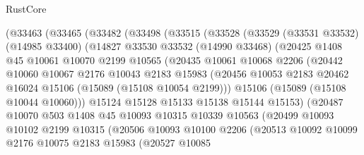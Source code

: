 \begin{lexlean}{RustCore}
\begin{coremodule}
        (@33463
          (@33465
            (@33482
              (@33498
                (@33515
                  (@33528
                    (@33529
                      (@33531 @33532)
                      (@14985 @33400)
                      (@14827
                        @33530
                        @33532
                        (@14990 @33468)
                        (@20425
                          @1408
                          @45
                          @10061
                          @10070
                          @2199
                          @10565
                          (@20435
                            @10061
                            @10068
                            @2206
                            (@20442
                              @10060
                              @10067
                              @2176
                              @10043
                              @2183
                              @15983
                              (@20456
                                @10053
                                @2183
                                @20462
                                @16024
                                @15106
                                (@15089 (@15108 @10054 @2199)))
                              @15106
                              (@15089 (@15108 @10044 @10060)))
                            @15124
                            @15128
                            @15133
                            @15138
                            @15144
                            @15153)
                          (@20487
                            @10070
                            @503
                            @1408
                            @45
                            @10093
                            @10315
                            @10339
                            @10563
                            (@20499
                              @10093
                              @10102
                              @2199
                              @10315
                              (@20506
                                @10093
                                @10100
                                @2206
                                (@20513
                                  @10092
                                  @10099
                                  @2176
                                  @10075
                                  @2183
                                  @15983
                                  (@20527
                                    @10085

\end{coremodule}
\end{lexlean}
